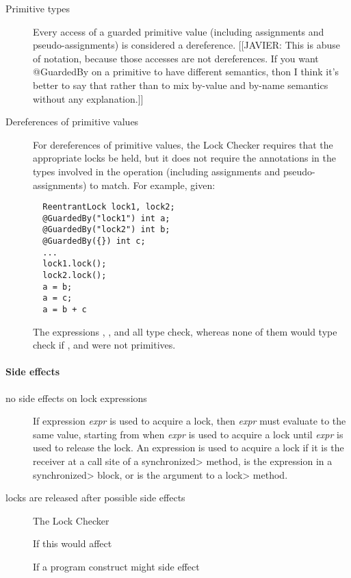 \begin{description}

\item[Primitive types]
  Every access of a guarded primitive value (including assignments
  and pseudo-assignments) is considered a dereference.
  [[JAVIER:  This is abuse of notation, because those accesses are not
      dereferences.  If you want @GuardedBy on a primitive to have
      different semantics, thon I think it's better to say that rather than
      to mix by-value and by-name semantics without any explanation.]]

\item[Dereferences of primitive values]
  For dereferences of primitive values, the Lock Checker requires that
  the appropriate locks be held, but it does not require the annotations
  in the types involved in the operation (including assignments and
  pseudo-assignments) to match. For example, given:
  \begin{verbatim}
  ReentrantLock lock1, lock2;
  @GuardedBy("lock1") int a;
  @GuardedBy("lock2") int b;
  @GuardedBy({}) int c;
  ...
  lock1.lock();
  lock2.lock();
  a = b;
  a = c;
  a = b + c
  \end{verbatim}
  The expressions , , and 
  all type check, whereas none of them would type check if ,
   and  were not primitives.

\end{description}

\paragraph{Side effects}

\begin{description}

\item[no side effects on lock expressions]
  If expression \emph{expr} is used to acquire a lock, then 
  \emph{expr} must evaluate to the same value, starting from when
  \emph{expr} is used to acquire a lock until \emph{expr} is used to
  release the lock.
  An expression is used to acquire a lock if it is the receiver at a 
  call site of a \<synchronized> method, is the expression in a
  \<synchronized> block, or is the argument to a \<lock> method.

\item[locks are released after possible side effects]
  The Lock Checker

  If this would affect 

  If a program construct might 
side effect

\end{description}


